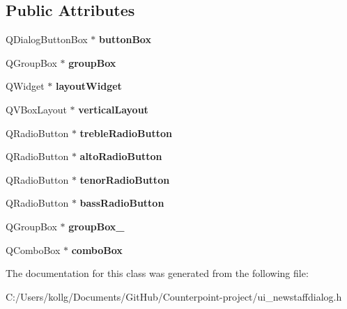 \subsection*{Public Attributes}
\begin{DoxyCompactItemize}
\item 
\hypertarget{class_ui___new_staff_dialog_a1bade48a910d0af18f039b4a78a948d3}{}Q\+Dialog\+Button\+Box $\ast$ {\bfseries button\+Box}\label{class_ui___new_staff_dialog_a1bade48a910d0af18f039b4a78a948d3}

\item 
\hypertarget{class_ui___new_staff_dialog_a42b05728e0042c530fd8543bb2a9c2f5}{}Q\+Group\+Box $\ast$ {\bfseries group\+Box}\label{class_ui___new_staff_dialog_a42b05728e0042c530fd8543bb2a9c2f5}

\item 
\hypertarget{class_ui___new_staff_dialog_aadd7fb749e7a9110930d383f5efc1b59}{}Q\+Widget $\ast$ {\bfseries layout\+Widget}\label{class_ui___new_staff_dialog_aadd7fb749e7a9110930d383f5efc1b59}

\item 
\hypertarget{class_ui___new_staff_dialog_a170f1fc421a1fe9b257284b4e9fe9868}{}Q\+V\+Box\+Layout $\ast$ {\bfseries vertical\+Layout}\label{class_ui___new_staff_dialog_a170f1fc421a1fe9b257284b4e9fe9868}

\item 
\hypertarget{class_ui___new_staff_dialog_ad943fea135f1de374ab7e0d5a7cceb99}{}Q\+Radio\+Button $\ast$ {\bfseries treble\+Radio\+Button}\label{class_ui___new_staff_dialog_ad943fea135f1de374ab7e0d5a7cceb99}

\item 
\hypertarget{class_ui___new_staff_dialog_a5792d1039e7a6c325cdc56afdafd3a5d}{}Q\+Radio\+Button $\ast$ {\bfseries alto\+Radio\+Button}\label{class_ui___new_staff_dialog_a5792d1039e7a6c325cdc56afdafd3a5d}

\item 
\hypertarget{class_ui___new_staff_dialog_a5d0bc85905731c6e38163152edf6288c}{}Q\+Radio\+Button $\ast$ {\bfseries tenor\+Radio\+Button}\label{class_ui___new_staff_dialog_a5d0bc85905731c6e38163152edf6288c}

\item 
\hypertarget{class_ui___new_staff_dialog_ab4325885d3c5b5793266c05af4899a05}{}Q\+Radio\+Button $\ast$ {\bfseries bass\+Radio\+Button}\label{class_ui___new_staff_dialog_ab4325885d3c5b5793266c05af4899a05}

\item 
\hypertarget{class_ui___new_staff_dialog_a5f1120f8e1c3fc71443eb6a7bec24df5}{}Q\+Group\+Box $\ast$ {\bfseries group\+Box\+\_}\label{class_ui___new_staff_dialog_a5f1120f8e1c3fc71443eb6a7bec24df5}

\item 
\hypertarget{class_ui___new_staff_dialog_a556d00ef21ad74c2de3c2d52c929e2dc}{}Q\+Combo\+Box $\ast$ {\bfseries combo\+Box}\label{class_ui___new_staff_dialog_a556d00ef21ad74c2de3c2d52c929e2dc}

\end{DoxyCompactItemize}


The documentation for this class was generated from the following file\+:\begin{DoxyCompactItemize}
\item 
C\+:/\+Users/kollg/\+Documents/\+Git\+Hub/\+Counterpoint-\/project/ui\+\_\+newstaffdialog.\+h\end{DoxyCompactItemize}
